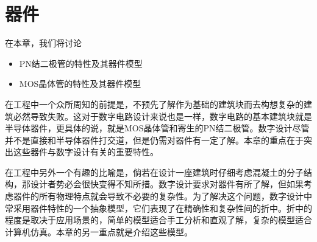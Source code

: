 \chapter{器件}
在本章，我们将讨论
\begin{itemize}
    \item PN结二极管的特性及其器件模型
    \item MOS晶体管的特性及其器件模型
\end{itemize}

在工程中一个众所周知的前提是，不预先了解作为基础的建筑块而去构想复杂的建筑必然导致失败。这对于数字电路设计来说也是一样，数字电路的基本建筑块就是半导体器件，更具体的说，就是MOS晶体管和寄生的PN结二极管。数字设计尽管并不是直接和半导体器件打交道，但是仍需对器件有一定了解。本章的重点在于突出这些器件与数字设计有关的重要特性。

在工程中另外一个有趣的比喻是，倘若在设计一座建筑时仔细考虑混凝土的分子结构，那设计者势必会很快变得不知所措。数字设计要求对器件有所了解，但如果考虑器件的所有物理特点就会导致不必要的复杂性。为了解决这个问题，数字设计中常采用器件特性的一个抽象模型，它们表现了在精确性和复杂性间的折中。折中的程度是取决于应用场景的，简单的模型适合手工分析和直观了解，复杂的模型适合计算机仿真。本章的另一重点就是介绍这些模型。


